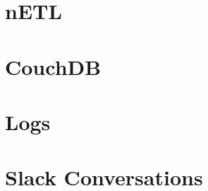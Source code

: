 \documentclass[
    parskip=full,
    a4paper
]{report}
\begin{document}
\begin{appendices}
    \chapter{nETL}
    
    
    \chapter{CouchDB}
    
    \chapter{Logs}
    
    \chapter{Slack Conversations}
    
\end{appendices}

\end{document}
